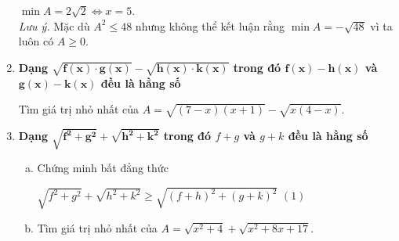 \begin{enumerate}[1.]
\begin{vd}
{\begin{enumerate}[a)]
		$\min A=2\sqrt{2}\Leftrightarrow x=5$.\\
		\textit{Lưu ý.} Mặc dù $A^2\leq48$ nhưng không thể kết luận rằng $\min A=-\sqrt{48}$ vì ta luôn có $A\geq0$.
		\end{enumerate}
	}
\end{vd}
\item \textbf{Dạng $\mathbf{\sqrt{f(x)\cdot g(x)}-\sqrt{h(x)\cdot k(x)}}$ trong đó $\mathbf{f(x)-h(x)}$ và $\mathbf{g(x)-k(x)}$ đều là hằng số}\\
\begin{vd}
 Tìm giá trị nhỏ nhất của $A=\sqrt{(7-x)(x+1)}-\sqrt{x(4-x)}.$
\end{vd}
\item \textbf{Dạng $\mathbf{\sqrt{f^2 + g^2}+\sqrt{h^2 +k^2}}$ trong đó $f+g$ và $g+k$ đều là hằng số}\\
	\begin{vd}
		\begin{enumerate}[a)]
			\item Chứng minh bất đẳng thức
			\begin{center}
			 $\sqrt{f^2 +g^2}+\sqrt{h^2 + k^2} \geq \sqrt{(f+h)^2 + (g+k)^2}$ \hfill$(1)$
			\end{center}
			\item Tìm giá trị nhỏ nhất của $A=\sqrt{x^2+4}+\sqrt{x^2+8x+17}.$
		\end{enumerate}
\end{vd}
\end{enumerate}
